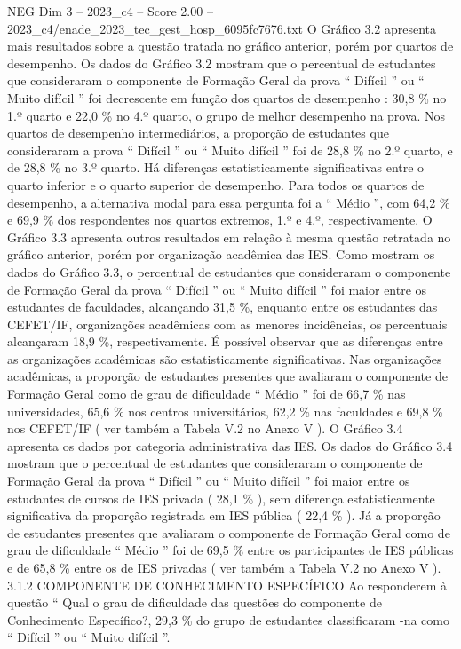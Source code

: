 \begin{textsample}{NEG Dim 3 – 2023\_c4 – Score 2.00 – 2023\_c4/enade\_2023\_tec\_gest\_hosp\_6095fc7676.txt}
O Gráfico 3.2 apresenta mais resultados sobre a questão tratada no gráfico anterior, porém por quartos de desempenho.
Os dados do Gráfico 3.2 mostram que o percentual de estudantes que consideraram o componente de Formação Geral da prova “ Difícil ” ou “ Muito difícil ” foi decrescente em função dos quartos de desempenho : 30,8 \% no 1.º quarto e 22,0 \% no 4.º quarto, o grupo de melhor desempenho na prova.
Nos quartos de desempenho intermediários, a proporção de estudantes que consideraram a prova “ Difícil ” ou “ Muito difícil ” foi de 28,8 \% no 2.º quarto, e de 28,8 \% no 3.º quarto.
Há diferenças estatisticamente significativas entre o quarto inferior e o quarto superior de desempenho.
Para todos os quartos de desempenho, a alternativa modal para essa pergunta foi a “ Médio ”, com 64,2 \% e 69,9 \% dos respondentes nos quartos extremos, 1.º e 4.º, respectivamente.
O Gráfico 3.3 apresenta outros resultados em relação à mesma questão retratada no gráfico anterior, porém por organização acadêmica das IES.
Como mostram os dados do Gráfico 3.3, o percentual de estudantes que consideraram o componente de Formação Geral da prova “ Difícil ” ou “ Muito difícil ” foi maior entre os estudantes de faculdades, alcançando 31,5 \%, enquanto entre os estudantes das CEFET/IF, organizações acadêmicas com as menores incidências, os percentuais alcançaram 18,9 \%, respectivamente.
É possível observar que as diferenças entre as organizações acadêmicas são estatisticamente significativas.
Nas organizações acadêmicas, a proporção de estudantes presentes que avaliaram o componente de Formação Geral como de grau de dificuldade “ Médio ” foi de 66,7 \% nas universidades, 65,6 \% nos centros universitários, 62,2 \% nas faculdades e 69,8 \% nos CEFET/IF ( ver também a Tabela V.2 no Anexo V ).
O Gráfico 3.4 apresenta os dados por categoria administrativa das IES.
Os dados do Gráfico 3.4 mostram que o percentual de estudantes que consideraram o componente de Formação Geral da prova “ Difícil ” ou “ Muito difícil ” foi maior entre os estudantes de cursos de IES privada ( 28,1 \% ), sem diferença estatisticamente significativa da proporção registrada em IES pública ( 22,4 \% ).
Já a proporção de estudantes presentes que avaliaram o componente de Formação Geral como de grau de dificuldade “ Médio ” foi de 69,5 \% entre os participantes de IES públicas e de 65,8 \% entre os de IES privadas ( ver também a Tabela V.2 no Anexo V ). 3.1.2 COMPONENTE DE CONHECIMENTO ESPECÍFICO Ao responderem à questão “ Qual o grau de dificuldade das questões do componente de Conhecimento Específico?, 29,3 \% do grupo de estudantes classificaram -na como “ Difícil ” ou “ Muito difícil ”.

\end{textsample}
